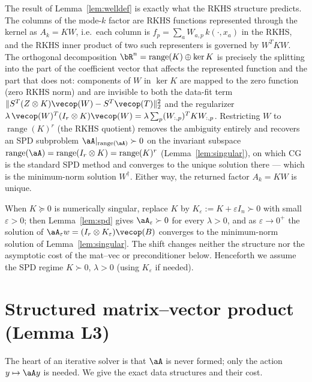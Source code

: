 \begin{remark}
\label{rem:rkhs}
The result of Lemma~\ref{lem:welldef} is exactly what the RKHS structure
predicts. The columns of the mode-$k$ factor are RKHS functions represented
through the kernel as $A_k=KW$, i.e.\ each column is
$f_p=\sum_{a} W_{a,p}\,k(\cdot,x_a)$ in the RKHS, and the RKHS inner product of
two such representers is governed by $W^{T}KW$. The orthogonal decomposition
$\bR^{n}=\operatorname{range}(K)\oplus\ker K$ is precisely the splitting into
the part of the coefficient vector that affects the represented function and
the part that does not: components of $W$ in $\ker K$ are mapped to the zero
function (zero RKHS norm) and are invisible to both the data-fit term
$\|S^{T}(Z\otimes K)\vecop(W)-S^{T}\vecop(T)\|_2^2$ and the regularizer
$\lambda\,\vecop(W)^{T}(I_r\otimes K)\vecop(W)=\lambda\sum_p (W_{:,p})^{T}KW_{:,p}$.
Restricting $W$ to $\operatorname{range}(K)^{r}$ (the RKHS quotient) removes the
ambiguity entirely and recovers an SPD subproblem
$\aA|_{\operatorname{range}(\aA)}\succ0$ on the invariant subspace
$\operatorname{range}(\aA)=\operatorname{range}(I_r\otimes K)
=\operatorname{range}(K)^{r}$ (Lemma~\ref{lem:singular}), on which CG is the
standard SPD method and converges to the unique solution there --- which is the
minimum-norm solution $W^{\dagger}$. Either way, the returned factor $A_k=KW$ is
unique.
\end{remark}


\begin{remark}\label{rem:reg}
When $K\succeq0$ is numerically singular, replace $K$ by
$K_\varepsilon:=K+\varepsilon I_n\succ0$ with small $\varepsilon>0$; then
Lemma~\ref{lem:spd} gives $\aA_\varepsilon\succ0$ for every $\lambda>0$, and as
$\varepsilon\to0^{+}$ the solution of
$\aA_\varepsilon w=(I_r\otimes K_\varepsilon)\vecop(B)$ converges to the
minimum-norm solution of Lemma~\ref{lem:singular}. The shift changes neither
the structure nor the asymptotic cost of the mat--vec or preconditioner below.
Henceforth we assume the SPD regime $K\succ0$, $\lambda>0$ (using
$K_\varepsilon$ if needed).
\end{remark}

\section*{Structured matrix--vector product (Lemma L3)}

The heart of an iterative solver is that $\aA$ is never formed; only the action
$y\mapsto \aA y$ is needed. We give the exact data structures and their cost.

